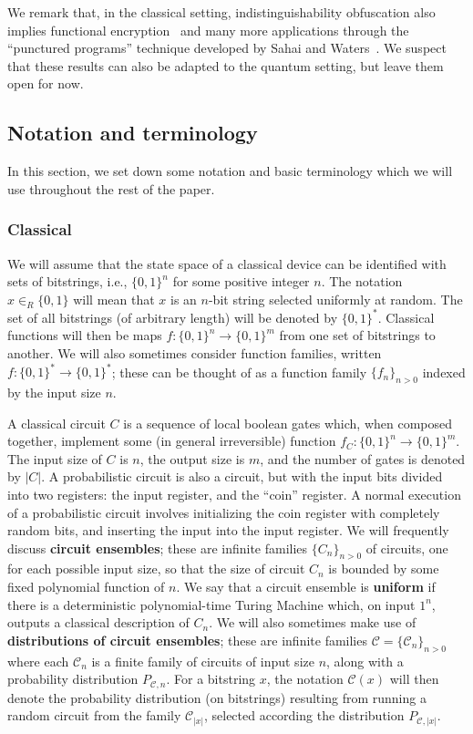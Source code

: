 \documentclass[envcountsame]{llncs}
\numberwithin{equation}{section}
\newcommand{\inrand}{\in_R}
\begin{document}
We remark that, in the classical setting, indistinguishability obfuscation also implies functional encryption~\cite{GGHRSW13} and many more applications through the ``punctured programs'' technique developed by Sahai and Waters~\cite{SW14}. We suspect that these results can also be adapted to the quantum setting, but leave them open for now.

\subsection{Notation and terminology}\label{sec:notation}

In this section, we set down some notation and basic terminology which we will use throughout the rest of the paper.

\subsubsection{Classical}

We will assume that the state space of a classical device can be identified with sets of bitstrings, i.e., $\{0, 1\}^n$ for some positive integer $n$. The notation $x \inrand \{0, 1\}$ will mean that $x$ is an $n$-bit string selected uniformly at random. The set of all bitstrings (of arbitrary length) will be denoted by $\{0, 1\}^*$. Classical functions will then be maps $f : \{0, 1\}^n \rightarrow \{0, 1\}^m$ from one set of bitstrings to another. We will also sometimes consider function families, written $f : \{0, 1\}^* \rightarrow \{0, 1\}^*$; these can be thought of as a function family $\{f_n\}_{n>0}$ indexed by the input size $n$. 

A classical circuit $C$ is a sequence of local boolean gates which, when composed together, implement some (in general irreversible) function $f_C: \{0, 1\}^n \rightarrow \{0, 1\}^m$. The input size of $C$ is $n$, the output size is $m$, and the number of gates is denoted by $|C|$. A probabilistic circuit is also a circuit, but with the input bits divided into two registers: the input register, and the ``coin'' register. A normal execution of a probabilistic circuit involves initializing the coin register with completely random bits, and inserting the input into the input register. We will frequently discuss \textbf{circuit ensembles}; these are infinite families $\{C_n\}_{n > 0}$ of circuits, one for each possible input size, so that the size of circuit $C_n$ is bounded by some fixed polynomial function of $n$.  We say that a circuit ensemble is \textbf{uniform} if there is a deterministic polynomial-time Turing Machine which, on input $1^n$, outputs a classical description of $C_n$.  We will also sometimes make use of \textbf{distributions of circuit ensembles}; these are infinite families $\mathcal C = \{\mathcal C_n\}_{n > 0}$ where each $\mathcal C_n$ is a finite family of circuits of input size $n$, along with a probability distribution $P_{\mathcal C, n}$. For a bitstring $x$, the notation $\mathcal C(x)$ will then denote the probability distribution (on bitstrings) resulting from running a random circuit from the family $\mathcal C_{|x|}$, selected according the distribution $P_{\mathcal C, |x|}$.
\end{document}
